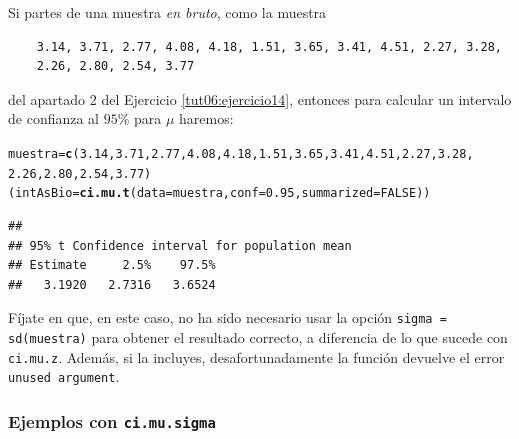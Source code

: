 \documentclass[10pt,a4paper]{article}\usepackage[]{graphicx}\usepackage[]{color}
\makeatletter
\newcommand{\hlnum}[1]{\textcolor[rgb]{0.686,0.059,0.569}{#1}}%
\newcommand{\hlstd}[1]{\textcolor[rgb]{0.345,0.345,0.345}{#1}}%
\newcommand{\hlkwb}[1]{\textcolor[rgb]{0.69,0.353,0.396}{#1}}%
\newcommand{\hlkwc}[1]{\textcolor[rgb]{0.333,0.667,0.333}{#1}}%
\newcommand{\hlkwd}[1]{\textcolor[rgb]{0.737,0.353,0.396}{\textbf{#1}}}%
\newenvironment{kframe}{%
 \def\at@end@of@kframe{}%
 \ifinner\ifhmode%
  \def\at@end@of@kframe{\end{minipage}}%
  \begin{minipage}{\columnwidth}%
 \fi\fi%
 \def\FrameCommand##1{\hskip\@totalleftmargin \hskip-\fboxsep
 \colorbox{shadecolor}{##1}\hskip-\fboxsep
     \hskip-\linewidth \hskip-\@totalleftmargin \hskip\columnwidth}%
 \MakeFramed {\advance\hsize-\width
   \@totalleftmargin\z@ \linewidth\hsize
   \@setminipage}}%
 {\par\unskip\endMakeFramed%
 \at@end@of@kframe}
\newenvironment{knitrout}{}{} %
\makeatother
\begin{document}
Si partes de una muestra {\em en bruto}, como la muestra
    \begin{verbatim}
    3.14, 3.71, 2.77, 4.08, 4.18, 1.51, 3.65, 3.41, 4.51, 2.27, 3.28,
    2.26, 2.80, 2.54, 3.77
    \end{verbatim}
del apartado 2 del Ejercicio \ref{tut06:ejercicio14}, entonces para calcular un intervalo de confianza al $95\%$ para $\mu$ haremos:
\begin{knitrout}
\color{fgcolor}\begin{kframe}
\begin{alltt}
\hlstd{muestra} \hlkwb{=} \hlkwd{c}\hlstd{(}\hlnum{3.14}\hlstd{,} \hlnum{3.71}\hlstd{,} \hlnum{2.77}\hlstd{,} \hlnum{4.08}\hlstd{,} \hlnum{4.18}\hlstd{,} \hlnum{1.51}\hlstd{,} \hlnum{3.65}\hlstd{,} \hlnum{3.41}\hlstd{,} \hlnum{4.51}\hlstd{,} \hlnum{2.27}\hlstd{,} \hlnum{3.28}\hlstd{,}
    \hlnum{2.26}\hlstd{,} \hlnum{2.80}\hlstd{,} \hlnum{2.54}\hlstd{,} \hlnum{3.77}\hlstd{)}
\hlstd{(intAsBio} \hlkwb{=} \hlkwd{ci.mu.t}\hlstd{(}\hlkwc{data}\hlstd{=muestra,} \hlkwc{conf}\hlstd{=}\hlnum{0.95}\hlstd{,} \hlkwc{summarized}\hlstd{=}\hlnum{FALSE}\hlstd{))}
\end{alltt}
\begin{verbatim}
## 
## 95% t Confidence interval for population mean 
## Estimate     2.5%    97.5% 
##   3.1920   2.7316   3.6524
\end{verbatim}
\end{kframe}
\end{knitrout}
Fíjate en que, en este caso, no ha sido necesario usar la opción {\tt sigma = sd(muestra)} para obtener el resultado correcto, a diferencia de lo que sucede con {\tt ci.mu.z}. Además, si la incluyes, desafortunadamente la función devuelve el error {\tt unused argument}.

\subsubsection*{Ejemplos con {\tt ci.mu.sigma}}
\end{document}
